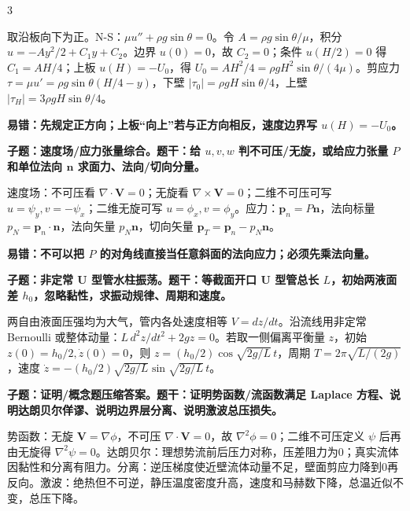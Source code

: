 \documentclass[a4paper]{article}
\newcommand{\qt}[1]{\vspace{0.25pt}\colorbox{Q}{\parbox{\dimexpr\linewidth-2\fboxsep}{\color{white}\bfseries #1}}\par}
\newcommand{\ans}[1]{\colorbox{G}{\parbox{\dimexpr\linewidth-2\fboxsep}{#1}}\par}
\newcommand{\warn}[1]{\colorbox{Y}{\parbox{\dimexpr\linewidth-2\fboxsep}{\color{E}\bfseries #1}}\par}
\begin{document}
\begin{multicols}{3}
\ans{取沿板向下为正。N-S：$\mu u''+\rho g\sin\theta=0$。令 $A=\rho g\sin\theta/\mu$，积分 $u=-Ay^2/2+C_1y+C_2$。边界 $u(0)=0$，故 $C_2=0$；条件 $u(H/2)=0$ 得 $C_1=AH/4$；上板 $u(H)=-U_0$，得 $U_0=AH^2/4=\rho gH^2\sin\theta/(4\mu)$。剪应力 $\tau=\mu u'=\rho g\sin\theta(H/4-y)$，下壁 $|\tau_0|=\rho gH\sin\theta/4$，上壁 $|\tau_H|=3\rho gH\sin\theta/4$。}
\warn{易错：先规定正方向；上板“向上”若与正方向相反，速度边界写 $u(H)=-U_0$。}
\qt{子题：速度场/应力张量综合。题干：给 $u,v,w$ 判不可压/无旋，或给应力张量 $P$ 和单位法向 $\bm n$ 求面力、法向/切向分量。}
\ans{速度场：不可压看 $\nabla\cdot\bm V=0$；无旋看 $\nabla\times\bm V=0$；二维不可压可写 $u=\psi_y,v=-\psi_x$；二维无旋可写 $u=\phi_x,v=\phi_y$。应力：$\bm p_n=P\bm n$，法向标量 $p_N=\bm p_n\cdot\bm n$，法向矢量 $p_N\bm n$，切向矢量 $\bm p_T=\bm p_n-p_N\bm n$。}
\warn{易错：不可以把 $P$ 的对角线直接当任意斜面的法向应力；必须先乘法向量。}
\qt{子题：非定常 U 型管水柱振荡。题干：等截面开口 U 型管总长 $L$，初始两液面差 $h_0$，忽略黏性，求振动规律、周期和速度。}
\ans{两自由液面压强均为大气，管内各处速度相等 $V=dz/dt$。沿流线用非定常 Bernoulli 或整体动量：$L\,d^2z/dt^2+2gz=0$。若取一侧偏离平衡量 $z$，初始 $z(0)=h_0/2,\dot z(0)=0$，则 $z=(h_0/2)\cos\sqrt{2g/L}\,t$，周期 $T=2\pi\sqrt{L/(2g)}$，速度 $\dot z=-(h_0/2)\sqrt{2g/L}\sin\sqrt{2g/L}\,t$。}
\qt{子题：证明/概念题压缩答案。题干：证明势函数/流函数满足 Laplace 方程、说明达朗贝尔佯谬、说明边界层分离、说明激波总压损失。}
\ans{势函数：无旋 $\bm V=\nabla\phi$，不可压 $\nabla\cdot\bm V=0$，故 $\nabla^2\phi=0$；二维不可压定义 $\psi$ 后再由无旋得 $\nabla^2\psi=0$。达朗贝尔：理想势流前后压力对称，压差阻力为0；真实流体因黏性和分离有阻力。分离：逆压梯度使近壁流体动量不足，壁面剪应力降到0再反向。激波：绝热但不可逆，静压温度密度升高，速度和马赫数下降，总温近似不变，总压下降。}


\end{multicols}
\end{document}

